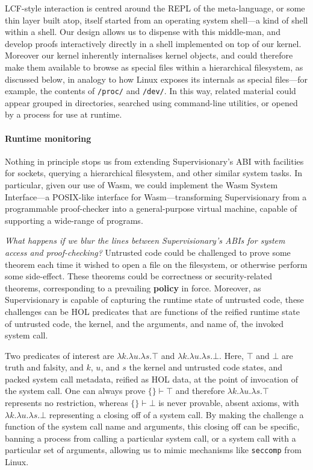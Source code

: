 \documentclass[sigplan, review]{acmart}
\newcommand{\deffont}[1]{\textbf{#1}}
\newcommand{\lam}[1]{\lambda{#1}.}
\begin{document}
LCF-style interaction is centred around the REPL of the meta-language, or some thin layer built atop, itself started from an operating system shell---a kind of shell within a shell.
Our design allows us to dispense with this middle-man, and develop proofs interactively directly in a shell implemented on top of our kernel.
Moreover our kernel inherently internalises kernel objects, and could therefore make them available to browse as special files within a hierarchical filesystem, as discussed below, in analogy to how Linux exposes its internals as special files---for example, the contents of \texttt{/proc/} and \texttt{/dev/}.
In this way, related material could appear grouped in directories, searched using command-line utilities, or opened by a process for use at runtime.

\paragraph{Runtime monitoring}

Nothing in principle stops us from extending Supervisionary's ABI with facilities for sockets, querying a hierarchical filesystem, and other similar system tasks.
In particular, given our use of Wasm, we could implement the Wasm System Interface---a POSIX-like interface for Wasm---transforming Supervisionary from a programmable proof-checker into a general-purpose virtual machine, capable of supporting a wide-range of programs.

\emph{What happens if we blur the lines between Supervisionary's ABIs for system access and proof-checking?}
Untrusted code could be challenged to prove some theorem each time it wished to open a file on the filesystem, or otherwise perform some side-effect.
These theorems could be correctness or security-related theorems, corresponding to a prevailing \deffont{policy} in force.
Moreover, as Supervisionary is capable of capturing the runtime state of untrusted code, these challenges can be HOL predicates that are functions of the reified runtime state of untrusted code, the kernel, and the arguments, and name of, the invoked system call.

Two predicates of interest are $\lam{k}\lam{u}\lam{s}\top$ and $\lam{k}\lam{u}\lam{s}\bot$.
Here, $\top$ and $\bot$ are truth and falsity, and $k$, $u$, and $s$ the kernel and untrusted code states, and packed system call metadata, reified as HOL data, at the point of invocation of the system call.
One can always prove $\{\} \vdash \top$ and therefore $\lam{k}\lam{u}\lam{s}\top$ represents no restriction, whereas $\{ \} \vdash \bot$ is never provable, absent axioms, with $\lam{k}\lam{u}\lam{s}\bot$ representing a closing off of a system call.
By making the challenge a function of the system call name and arguments, this closing off can be specific, banning a process from calling a particular system call, or a system call with a particular set of arguments, allowing us to mimic mechanisms like \texttt{seccomp} from Linux.
\end{document}
